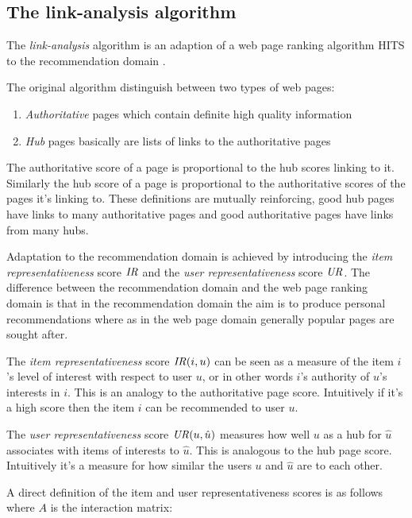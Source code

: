 \subsection{The link-analysis algorithm}\label{sec:background:linkanalysis}

The \textit{link-analysis} algorithm is an adaption of a web page ranking algorithm HITS \cite{kleinberg1999authoritative} to the recommendation domain \cite{huang2004link, huang2007comparison}.

The original algorithm distinguish between two types of web pages:

\begin{enumerate}
    \item \textit{Authoritative} pages which contain definite high quality information
    \item \textit{Hub} pages basically are lists of links to the authoritative pages
\end{enumerate}

The authoritative score of a page is proportional to the hub scores linking to it. Similarly the hub score of a page is proportional to the authoritative scores of the pages it's linking to. These definitions are mutually reinforcing, good hub pages have links to many authoritative pages and good authoritative pages have links from many hubs.

Adaptation to the recommendation domain is achieved by introducing the \textit{item representativeness} score $\mathit{IR}$ and the \textit{user representativeness} score $\mathit{UR}$. The difference between the recommendation domain and the web page ranking domain is that in the recommendation domain the aim is to produce personal recommendations where as in the web page domain generally popular pages are sought after.

The \textit{item representativeness} score $\mathit{IR}(i, u)$ can be seen as a measure of the item $i$'s level of interest with respect to user $u$, or in other words $i$'s authority of $u$'s interests in $i$. This is an analogy to the authoritative page score. Intuitively if it's a high score then the item $i$ can be recommended to user $u$.

The \textit{user representativeness} score $\mathit{UR}(u, \hat{u})$ measures how well $u$ as a hub for $\hat{u}$ associates with items of interests to $\hat{u}$. This is analogous to the hub page score. Intuitively it's a measure for how similar the users $u$ and $\hat{u}$ are to each other.

A direct definition of the item and user representativeness scores is as follows where $A$ is the interaction matrix:

